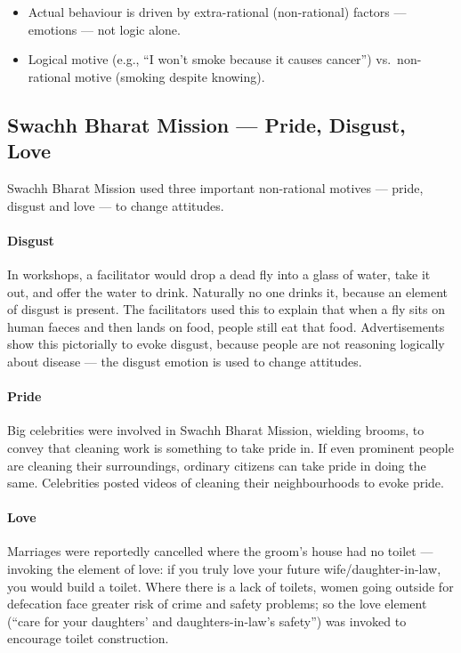 \begin{KeyConcept}
\begin{itemize}
\item Actual behaviour is driven by extra-rational (non-rational) factors --- emotions --- not logic alone.
\item Logical motive (e.g., ``I won't smoke because it causes cancer'') vs.\ non-rational motive (smoking despite knowing).
\end{itemize}
\end{KeyConcept}

\subsection{Swachh Bharat Mission --- Pride, Disgust, Love}

Swachh Bharat Mission used three important non-rational motives --- pride, disgust and love --- to change attitudes.

\paragraph{Disgust} In workshops, a facilitator would drop a dead fly into a glass of water, take it out, and offer the water to drink. Naturally no one drinks it, because an element of disgust is present. The facilitators used this to explain that when a fly sits on human faeces and then lands on food, people still eat that food. Advertisements show this pictorially to evoke disgust, because people are not reasoning logically about disease --- the disgust emotion is used to change attitudes.

\paragraph{Pride} Big celebrities were involved in Swachh Bharat Mission, wielding brooms, to convey that cleaning work is something to take pride in. If even prominent people are cleaning their surroundings, ordinary citizens can take pride in doing the same. Celebrities posted videos of cleaning their neighbourhoods to evoke pride.

\paragraph{Love} Marriages were reportedly cancelled where the groom's house had no toilet --- invoking the element of love: if you truly love your future wife/daughter-in-law, you would build a toilet. Where there is a lack of toilets, women going outside for defecation face greater risk of crime and safety problems; so the love element (``care for your daughters' and daughters-in-law's safety'') was invoked to encourage toilet construction.

